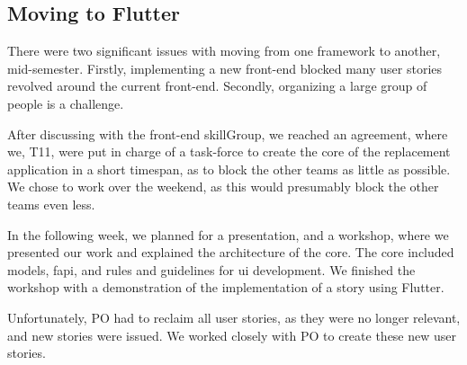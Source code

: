 \subsection{Moving to Flutter}

There were two significant issues with moving from one framework to another, mid-semester. Firstly, implementing a new front-end blocked many user stories revolved around the current front-end. Secondly, organizing a large group of people is a challenge.  

After discussing with the front-end \gls{skillGroup}, we reached an agreement, where we, \gls{T11}, were put in charge of a task-force to create the core of the replacement application in a short timespan, as to block the other teams as little as possible. We chose to work over the weekend, as this would presumably block the other teams even less. 

In the following week, we planned for a presentation, and a workshop, where we presented our work and explained the architecture of the core. The core included models, \gls{fapi}, and rules and guidelines for \gls{ui} development. We finished the workshop with a demonstration of the implementation of a story using Flutter.  

Unfortunately, \gls{PO} had to reclaim all user stories, as they were no longer relevant, and new stories were issued. We worked closely with \gls{PO} to create these new user stories.
